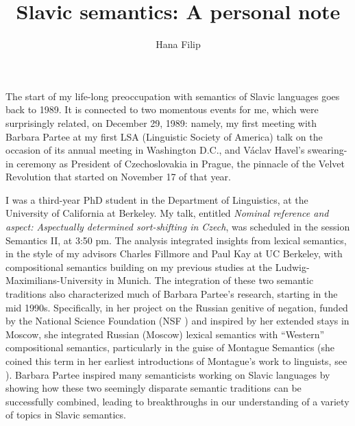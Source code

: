 \documentclass[output=paper]{langscibook}
\title{Slavic semantics: A personal note}
\author{Hana Filip}
\begin{document}
\maketitle
The start of my life-long preoccupation with semantics of Slavic languages goes back to 1989.  It is connected to two momentous events for me, which were surprisingly related, on December 29, 1989: namely, my first meeting with Barbara Partee at my first LSA (Linguistic Society of America) talk on the occasion of its annual meeting in Washington D.C., and Václav Havel's swearing-in ceremony as President of Czechoslovakia in Prague, the pinnacle of the Velvet Revolution that started on November 17 of that year. 

I was a third-year PhD student in the Department of Linguistics, at the University of California at Berkeley.  My talk, entitled \textit{Nominal reference and aspect: Aspectually determined sort-shifting in Czech}, was scheduled in the session Semantics II, at 3:50 pm. The analysis integrated insights from lexical semantics, in the style of my advisors Charles Fillmore and Paul Kay at UC Berkeley, with compositional semantics building on my previous studies at the Ludwig-Maximilians-University in Munich. The integration of
these two semantic traditions also characterized much of Barbara Partee's research, starting in the mid 1990s. Specifically, in her 
project on the Russian genitive of negation, funded by the 
National Science Foundation (NSF%
) and inspired by her extended stays in Moscow, she integrated Russian (Moscow) lexical semantics with ``Western'' compositional semantics, particularly in the guise of Montague Semantics (she coined this term in her earliest introductions of Montague's work to linguists, 
see \citealt{Partee2005,Partee2015}).
Barbara Partee inspired many semanticists working on Slavic languages by showing how 
these two seemingly disparate semantic traditions can be successfully combined, leading 
to breakthroughs in our understanding of a variety of topics in Slavic semantics. 
\end{document}
